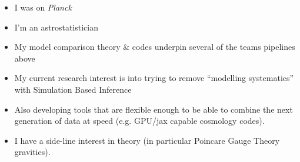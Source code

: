 \documentclass[aspectratio=169]{beamer}
\begin{document}
\begin{frame}
\begin{itemize}
        \item I was on \textit{Planck}
        \item I'm an astrostatistician
        \item My model comparison theory \& codes underpin several of the teams pipelines above
        \item My current research interest is into trying to remove ``modelling systematics'' with Simulation Based Inference
        \item Also developing tools that are flexible enough to be able to combine the next generation of data at speed (e.g. GPU/jax capable cosmology codes).
        \item I have a side-line interest in theory (in particular Poincare Gauge Theory gravities).
    \end{itemize}
\end{frame}
\end{document}
